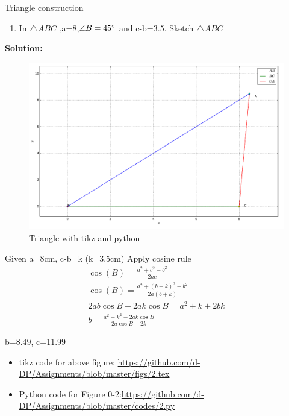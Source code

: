 \begin{frame}{Triangle construction}
\begin{enumerate}
\conti
\item In $\triangle{ABC}$ ,a=8,$\angle{B}=45\degree$ and c-b=3.5. Sketch $\triangle{ABC}$
\seti
\end{enumerate}
\textbf{Solution:}
\begin{figure}[!ht]
\resizebox{1\linewidth}{!}
{

\includegraphics[scale=0.4]{./figs/triangle/constr.png}
}
\caption{Triangle with tikz and python }
\label{fig:foo}
\end{figure}
\end{frame}
\begin{frame}
Given a=8cm, c-b=k (k=3.5cm)
Apply cosine rule 
\begin{align*}
	\cos{(B)} = \frac{a^2+c^2-b^2}{2ac}\\
	\cos{(B)}= \frac{a^2+(b+k)^2-b^2}{2a(b+k)}\\
	2ab\cos{B}+2ak\cos{B}=a^2+k+2bk\\
	b=\frac{a^2 + k^2-2ak \cos{B} }{2a\cos{B}-2k}
\end{align*}
\begin{center}
b=8.49, c=11.99
\end{center}
\begin{itemize}
\item tikz code for above figure: \url{https://github.com/d-DP/Assignments/blob/master/figs/2.tex}
\item Python code for Figure 0-2:\url{https://github.com/d-DP/Assignments/blob/master/codes/2.py}\\
\end{itemize}
\end{frame}